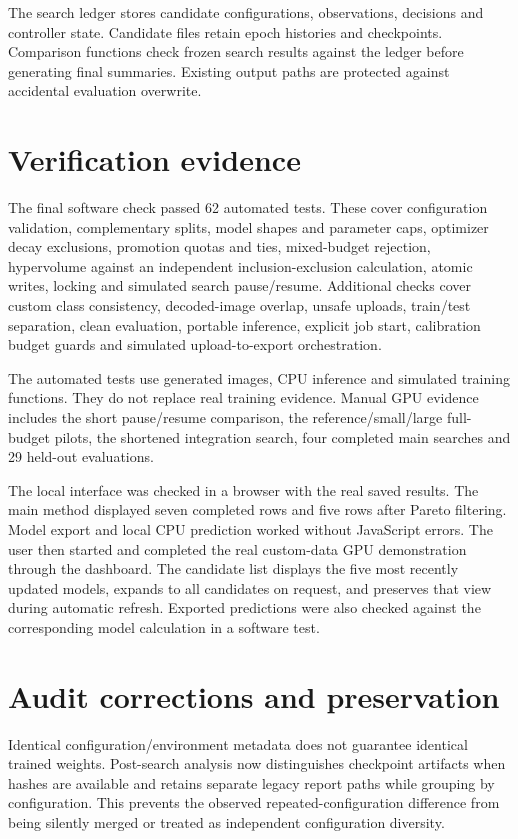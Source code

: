 \documentclass[11pt,a4paper,oneside]{report}
\begin{document}
The search ledger stores candidate configurations, observations, decisions and controller state. Candidate files retain epoch histories and checkpoints. Comparison functions check frozen search results against the ledger before generating final summaries. Existing output paths are protected against accidental evaluation overwrite.

\section{Verification evidence}

The final software check passed 62 automated tests. These cover configuration validation, complementary splits, model shapes and parameter caps, optimizer decay exclusions, promotion quotas and ties, mixed-budget rejection, hypervolume against an independent inclusion-exclusion calculation, atomic writes, locking and simulated search pause/resume. Additional checks cover custom class consistency, decoded-image overlap, unsafe uploads, train/test separation, clean evaluation, portable inference, explicit job start, calibration budget guards and simulated upload-to-export orchestration.

The automated tests use generated images, CPU inference and simulated training functions. They do not replace real training evidence. Manual GPU evidence includes the short pause/resume comparison, the reference/small/large full-budget pilots, the shortened integration search, four completed main searches and 29 held-out evaluations.

The local interface was checked in a browser with the real saved results. The main method displayed seven completed rows and five rows after Pareto filtering. Model export and local CPU prediction worked without JavaScript errors. The user then started and completed the real custom-data GPU demonstration through the dashboard. The candidate list displays the five most recently updated models, expands to all candidates on request, and preserves that view during automatic refresh. Exported predictions were also checked against the corresponding model calculation in a software test.

\section{Audit corrections and preservation}

Identical configuration/environment metadata does not guarantee identical trained weights. Post-search analysis now distinguishes checkpoint artifacts when hashes are available and retains separate legacy report paths while grouping by configuration. This prevents the observed repeated-configuration difference from being silently merged or treated as independent configuration diversity.
\end{document}
